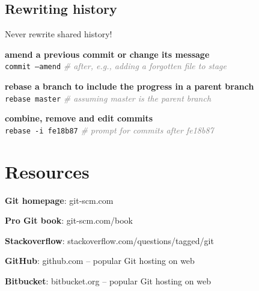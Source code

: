 \documentclass[landscape]{article}
\newcommand*{\prog}{\texttt}
\newcommand*{\proge}[1]{\textcolor{gray}{\textit{\# #1}}}
\begin{document}
\begin{multicols*}{3}
  \subsection{Rewriting history}

  Never rewrite shared history!
  \begin{myitemize}
    \item \textbf{amend a previous commit or change its message}\\
      \prog{commit --amend} \proge{after, e.g., adding a forgotten file to stage}
    \item \textbf{rebase a branch to include the progress in a parent branch}\\
      \prog{rebase master} \proge{assuming master is the parent branch}
    \item \textbf{combine, remove and edit commits}\\
      \prog{rebase -i fe18b87} \proge{prompt for commits after fe18b87}
  \end{myitemize}

  \section{Resources}

  \begin{myitemize}
  \item \textbf{Git homepage}: git-scm.com
  \item \textbf{Pro Git book}: git-scm.com/book
  \item \textbf{Stackoverflow}: stackoverflow.com/questions/tagged/git
  \item \textbf{GitHub}: github.com -- popular Git hosting on web
  \item \textbf{Bitbucket}: bitbucket.org -- popular Git hosting on web
  \end{myitemize}

\end{multicols*}
\end{document}
